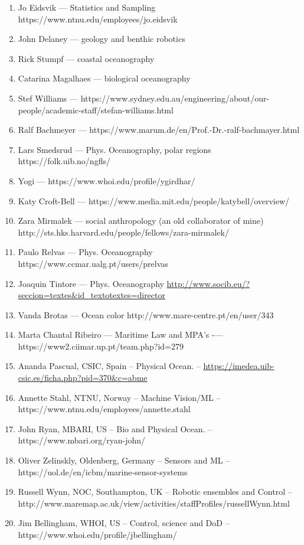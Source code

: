 \documentclass[12pt]{article}
\begin{document}
\begin{enumerate}[noitemsep,topsep=0pt,parsep=0pt,partopsep=0pt]
  
\item Jo Eidsvik — Statistics and Sampling https://www.ntnu.edu/employees/jo.eidsvik
\item John Delaney — geology and benthic robotics
\item Rick Stumpf — coastal oceanography 
\item Catarina Magalhaes — biological oceanography
\item Stef Williams — https://www.sydney.edu.au/engineering/about/our-people/academic-staff/stefan-williams.html
\item Ralf Bachmeyer — https://www.marum.de/en/Prof.-Dr.-ralf-bachmayer.html
\item Lars Smedsrud — Phys. Oceanography, polar regions https://folk.uib.no/ngfls/
\item Yogi — https://www.whoi.edu/profile/ygirdhar/
\item Katy Croft-Bell  — https://www.media.mit.edu/people/katybell/overview/
\item Zara Mirmalek — social anthropology (an old collaborator of mine) http://sts.hks.harvard.edu/people/fellows/zara-mirmalek/
\item Paulo Relvas — Phys. Oceanography https://www.ccmar.ualg.pt/users/prelvas
\item Joaquin Tintore — Phys. Oceanography \url{http://www.socib.eu/?seccion=textes&id_textotextes=director}
\item Vanda Brotas — Ocean color http://www.mare-centre.pt/en/user/343
\item Marta Chantal Ribeiro — Maritime Law and MPA’s -— https://www2.ciimar.up.pt/team.php?id=279
\item Ananda Pascual, CSIC, Spain -- Physical Ocean. -- \url{https://imedea.uib-csic.es/ficha.php?pid=370&c=abme}
\item Annette Stahl, NTNU, Norway -- Machine Vision/ML -- https://www.ntnu.edu/employees/annette.stahl
\item John Ryan, MBARI, US -- Bio and Physical Ocean. -- https://www.mbari.org/ryan-john/
\item Oliver Zelinskly, Oldenberg, Germany -- Sensors and ML -- https://uol.de/en/icbm/marine-sensor-systems
\item Russell Wynn, NOC, Southampton, UK  -- Robotic ensembles and
  Control -- http://www.maremap.ac.uk/view/activities/staffProfiles/russellWynn.html
\item Jim Bellingham, WHOI, US -- Control, science and DoD  -- https://www.whoi.edu/profile/jbellingham/

\end{enumerate}
\end{document}
